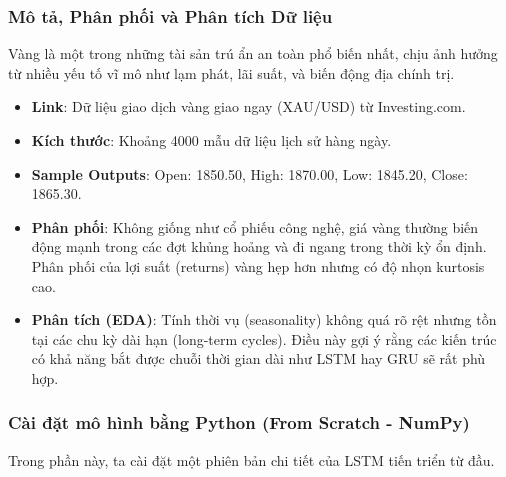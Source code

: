 \subsubsection{Mô tả, Phân phối và Phân tích Dữ liệu}
Vàng là một trong những tài sản trú ẩn an toàn phổ biến nhất, chịu ảnh hưởng từ nhiều yếu tố vĩ mô như lạm phát, lãi suất, và biến động địa chính trị.
\begin{itemize}
    \item \textbf{Link}: Dữ liệu giao dịch vàng giao ngay (XAU/USD) từ Investing.com.
    \item \textbf{Kích thước}: Khoảng 4000 mẫu dữ liệu lịch sử hàng ngày.
    \item \textbf{Sample Outputs}: Open: 1850.50, High: 1870.00, Low: 1845.20, Close: 1865.30.
    \item \textbf{Phân phối}: Không giống như cổ phiếu công nghệ, giá vàng thường biến động mạnh trong các đợt khủng hoảng và đi ngang trong thời kỳ ổn định. Phân phối của lợi suất (returns) vàng hẹp hơn nhưng có độ nhọn kurtosis cao.
    \item \textbf{Phân tích (EDA)}: Tính thời vụ (seasonality) không quá rõ rệt nhưng tồn tại các chu kỳ dài hạn (long-term cycles). Điều này gợi ý rằng các kiến trúc có khả năng bắt được chuỗi thời gian dài như LSTM hay GRU sẽ rất phù hợp.
\end{itemize}

\subsubsection{Cài đặt mô hình bằng Python (From Scratch - NumPy)}
Trong phần này, ta cài đặt một phiên bản chi tiết của LSTM tiến triển từ đầu.

